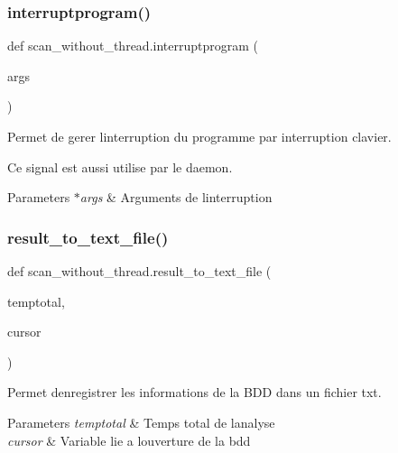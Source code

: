 \subsubsection{\texorpdfstring{interruptprogram()}{interruptprogram()}}
{\footnotesize\ttfamily def scan\+\_\+without\+\_\+thread.\+interruptprogram (\begin{DoxyParamCaption}\item[{}]{args }\end{DoxyParamCaption})}



Permet de gerer l\textquotesingle{}interruption du programme par interruption clavier. 

Ce signal est aussi utilise par le daemon. 
\begin{DoxyParams}{Parameters}
{\em $\ast$args} & Arguments de l\textquotesingle{}interruption \\
\hline
\end{DoxyParams}
\hypertarget{namespacescan__without__thread_a4e3953068dc120adafff06dc2afcc537}{}\label{namespacescan__without__thread_a4e3953068dc120adafff06dc2afcc537} 
\subsubsection{\texorpdfstring{result\+\_\+to\+\_\+text\+\_\+file()}{result\_to\_text\_file()}}
{\footnotesize\ttfamily def scan\+\_\+without\+\_\+thread.\+result\+\_\+to\+\_\+text\+\_\+file (\begin{DoxyParamCaption}\item[{}]{temptotal,  }\item[{}]{cursor }\end{DoxyParamCaption})}



Permet d\textquotesingle{}enregistrer les informations de la B\+DD dans un fichier txt. 


\begin{DoxyParams}{Parameters}
{\em temptotal} & Temps total de l\textquotesingle{}analyse \\
\hline
{\em cursor} & Variable lie a l\textquotesingle{}ouverture de la bdd \\
\hline
\end{DoxyParams}
\hypertarget{namespacescan__without__thread_a979b78810c1d5ecee955f6c1c3618c6b}{}\label{namespacescan__without__thread_a979b78810c1d5ecee955f6c1c3618c6b} 
